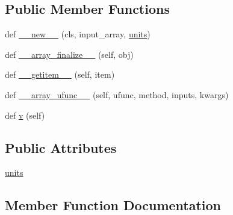 \subsection*{Public Member Functions}
\begin{DoxyCompactItemize}
\item 
def \hyperlink{classmatplotlib_1_1tests_1_1test__image_1_1QuantityND_a768d22827adfb922520a4cceaba5b697}{\+\_\+\+\_\+new\+\_\+\+\_\+} (cls, input\+\_\+array, \hyperlink{classmatplotlib_1_1tests_1_1test__image_1_1QuantityND_a2c8b629e35fd2f152a420645b8715d4b}{units})
\item 
def \hyperlink{classmatplotlib_1_1tests_1_1test__image_1_1QuantityND_a17cf1a5ac602e32f175979164d086537}{\+\_\+\+\_\+array\+\_\+finalize\+\_\+\+\_\+} (self, obj)
\item 
def \hyperlink{classmatplotlib_1_1tests_1_1test__image_1_1QuantityND_ae6f091206ccf11958d592904b1ac0fd8}{\+\_\+\+\_\+getitem\+\_\+\+\_\+} (self, item)
\item 
def \hyperlink{classmatplotlib_1_1tests_1_1test__image_1_1QuantityND_a8485f92d011894be0ffc07437f9fd13c}{\+\_\+\+\_\+array\+\_\+ufunc\+\_\+\+\_\+} (self, ufunc, method, inputs, kwargs)
\item 
def \hyperlink{classmatplotlib_1_1tests_1_1test__image_1_1QuantityND_ac847ec46a12fdb91fbff3b9a545e6ca9}{v} (self)
\end{DoxyCompactItemize}
\subsection*{Public Attributes}
\begin{DoxyCompactItemize}
\item 
\hyperlink{classmatplotlib_1_1tests_1_1test__image_1_1QuantityND_a2c8b629e35fd2f152a420645b8715d4b}{units}
\end{DoxyCompactItemize}


\subsection{Member Function Documentation}
\mbox{\label{classmatplotlib_1_1tests_1_1test__image_1_1QuantityND_a17cf1a5ac602e32f175979164d086537}} 
